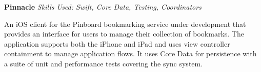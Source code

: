 \textbf{Pinnacle}  \newline
\textit{Skills Used: Swift, Core Data, Testing, Coordinators}

An iOS client for the Pinboard bookmarking service under development that
provides an interface for users to manage their collection of bookmarks. The
application supports both the iPhone and iPad and uses view controller
containment to manage application flows. It uses Core Data for persistence with
a suite of unit and performance tests covering the sync system.

